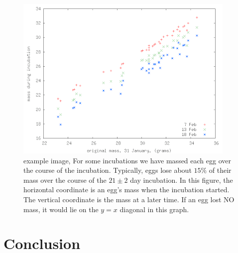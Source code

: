 \documentclass[prb,preprint]{revtex4-2}
\begin{document}
\begin{figure}[h]
\centering
\includegraphics[width=\columnwidth]{egg_mass_over_time.png}
\caption{
example image, For some incubations we have massed each egg over the course of the incubation.  Typically, eggs lose about $15\%$ of their mass over the course of the $21\pm2$ day incubation. In this figure, the horizontal coordinate is an egg's mass when the incubation started.  The vertical coordinate is the mass at a later time.  If an egg lost NO mass, it would lie on the $y=x$ diagonal in this graph.  
}
\label{incubator}
\end{figure}


\section{Conclusion}

\begin{acknowledgments}

\end{acknowledgments}
\end{document}
